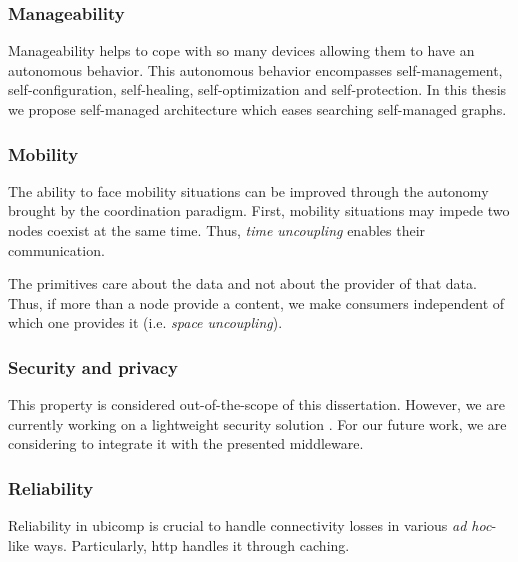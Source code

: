 

\subsubsection{Manageability}

Manageability helps to cope with so many devices allowing them to have an autonomous behavior. %
This autonomous behavior encompasses self-management, self-configuration, self-healing, self-optimization and self-protection.
In this thesis we propose self-managed architecture which eases searching self-managed graphs.


\subsubsection{Mobility}

The ability to face mobility situations can be improved through the autonomy brought by the coordination paradigm. %
First, mobility situations may impede two nodes coexist at the same time.
Thus, \emph{time uncoupling} enables their communication.

The primitives care about the data and not about the provider of that data.
Thus, if more than a node provide a content, we make consumers independent of which one provides it (i.e. \emph{space uncoupling}).


\subsubsection{Security and privacy}

This property is considered out-of-the-scope of this dissertation.
However, we are currently working on a lightweight security solution \citep{naranjo_lightweight_2012}. %
For our future work, we are considering to integrate it with the presented middleware.


\subsubsection{Reliability}

Reliability in \ac{ubicomp} is crucial to handle connectivity losses in various \emph{ad hoc}-like ways.
Particularly, \ac{http} handles it through caching.


